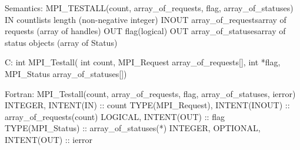 Semantics:
MPI_TESTALL(count, array_of_requests, flag, array_of_statuses)
IN countlists length (non-negative integer)
INOUT array_of_requestsarray of requests (array of handles)
OUT flag(logical)
OUT array_of_statusesarray of status objects (array of Status)

C:
int MPI_Testall(
    int count, MPI_Request array_of_requests[],
    int *flag, MPI_Status array_of_statuses[])

Fortran:
MPI_Testall(count, array_of_requests, flag, array_of_statuses, ierror)
INTEGER, INTENT(IN) :: count
TYPE(MPI_Request), INTENT(INOUT) :: array_of_requests(count)
LOGICAL, INTENT(OUT) :: flag
TYPE(MPI_Status) :: array_of_statuses(*)
INTEGER, OPTIONAL, INTENT(OUT) :: ierror
